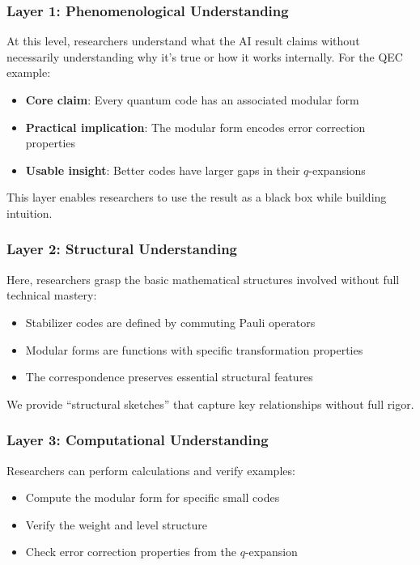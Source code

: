 \documentclass[11pt,a4paper]{article}
\begin{document}
\subsubsection{Layer 1: Phenomenological Understanding}
At this level, researchers understand what the AI result claims without necessarily understanding why it's true or how it works internally. For the QEC example:
\begin{itemize}
\item \textbf{Core claim}: Every quantum code has an associated modular form
\item \textbf{Practical implication}: The modular form encodes error correction properties
\item \textbf{Usable insight}: Better codes have larger gaps in their $q$-expansions
\end{itemize}

This layer enables researchers to use the result as a black box while building intuition.

\subsubsection{Layer 2: Structural Understanding}
Here, researchers grasp the basic mathematical structures involved without full technical mastery:
\begin{itemize}
\item Stabilizer codes are defined by commuting Pauli operators
\item Modular forms are functions with specific transformation properties
\item The correspondence preserves essential structural features
\end{itemize}

We provide ``structural sketches'' that capture key relationships without full rigor.

\subsubsection{Layer 3: Computational Understanding}
Researchers can perform calculations and verify examples:
\begin{itemize}
\item Compute the modular form for specific small codes
\item Verify the weight and level structure
\item Check error correction properties from the $q$-expansion
\end{itemize}
\end{document}
